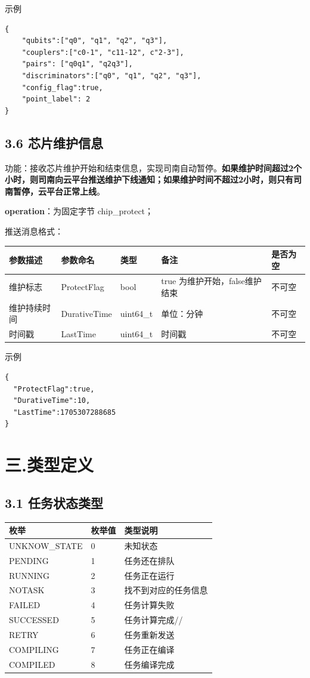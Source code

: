 \documentclass{ctexart}
\begin{document}
示例

\begin{verbatim}{
    "qubits":["q0", "q1", "q2", "q3"],
    "couplers":["c0-1", "c11-12", c"2-3"],
    "pairs": ["q0q1", "q2q3"],
    "discriminators":["q0", "q1", "q2", "q3"],
    "config_flag":true,
    "point_label": 2
}\end{verbatim}
\subsection{3.6 芯片维护信息}

功能：接收芯片维护开始和结束信息，实现司南自动暂停。\textbf{如果维护时间超过2个小时，则司南向云平台推送维护下线通知；如果维护时间不超过2小时，则只有司南暂停，云平台正常上线}。

\textbf{operation}：为固定字节 chip_protect；

推送消息格式：

\begin{longtable}{|l|l|l|l|l|}
\hline
\textbf{\textbf{参数描述}} & \textbf{\textbf{参数命名}} & \textbf{\textbf{类型}} & \textbf{\textbf{备注}} & \textbf{\textbf{是否为空}} \\
\hline
维护标志 & ProtectFlag & bool & true 为维护开始，false维护结束 & 不可空 \\
维护持续时间 & DurativeTime & uint64_t & 单位：分钟 & 不可空 \\
时间戳 & LastTime & uint64_t & 时间戳 & 不可空 \\
\hline
\end{longtable}

示例

\begin{verbatim}{
  "ProtectFlag":true,
  "DurativeTime":10,
  "LastTime":1705307288685
}\end{verbatim}

\section{三.类型定义}

\subsection{3.1 任务状态类型}

\begin{longtable}{|l|l|l|}
\hline
\textbf{\textbf{枚举}} & \textbf{\textbf{枚举值}} & \textbf{\textbf{类型说明}} \\
\hline
UNKNOW_STATE & 0 & 未知状态 \\
PENDING & 1 & 任务还在排队 \\
RUNNING & 2 & 任务正在运行 \\
NOTASK & 3 & 找不到对应的任务信息 \\
FAILED & 4 & 任务计算失败 \\
SUCCESSED & 5 & 任务计算完成// \\
RETRY & 6 & 任务重新发送 \\
COMPILING & 7 & 任务正在编译 \\
COMPILED & 8 & 任务编译完成 \\
\hline
\end{longtable}
\end{document}
